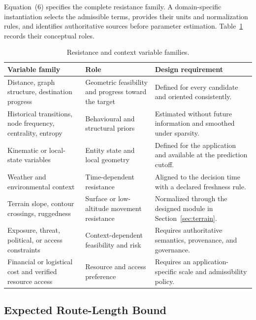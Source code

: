 \documentclass[11pt,letterpaper]{article}
\begin{document}
Equation~(6) specifies the complete resistance family. A domain-specific instantiation selects the admissible terms, provides their units and normalization rules, and identifies authoritative sources before parameter estimation. Table~\ref{tab:variables} records their conceptual roles.

\begin{table}[htbp]
\centering
\caption{Resistance and context variable families.}
\label{tab:variables}
\footnotesize
\begin{tabularx}{\textwidth}{>{\raggedright\arraybackslash}p{} >{\raggedright\arraybackslash}p{} X}
\toprule
\textbf{Variable family} & \textbf{Role} & \textbf{Design requirement} \\
\midrule
Distance, graph structure, destination progress & Geometric feasibility and progress toward the target & Defined for every candidate and oriented consistently. \\
Historical transitions, node frequency, centrality, entropy & Behavioural and structural priors & Estimated without future information and smoothed under sparsity. \\
Kinematic or local-state variables & Entity state and local geometry & Defined for the application and available at the prediction cutoff. \\
Weather and environmental context & Time-dependent resistance & Aligned to the decision time with a declared freshness rule. \\
Terrain slope, contour crossings, ruggedness & Surface or low-altitude movement resistance & Normalized through the designed module in Section~\ref{sec:terrain}. \\
Exposure, threat, political, or access constraints & Context-dependent feasibility and risk & Requires authoritative semantics, provenance, and governance. \\
Financial or logistical cost and verified resource access & Resource and access preference & Requires an application-specific scale and admissibility policy. \\
\bottomrule
\end{tabularx}
\end{table}

\subsection{Expected Route-Length Bound}
\end{document}
